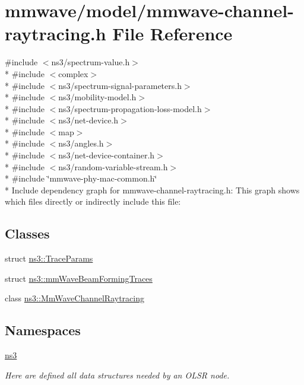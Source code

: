 \hypertarget{mmwave-channel-raytracing_8h}{}\section{mmwave/model/mmwave-\/channel-\/raytracing.h File Reference}
\label{mmwave-channel-raytracing_8h}
{\ttfamily \#include $<$ns3/spectrum-\/value.\+h$>$}\\*
{\ttfamily \#include $<$complex$>$}\\*
{\ttfamily \#include $<$ns3/spectrum-\/signal-\/parameters.\+h$>$}\\*
{\ttfamily \#include $<$ns3/mobility-\/model.\+h$>$}\\*
{\ttfamily \#include $<$ns3/spectrum-\/propagation-\/loss-\/model.\+h$>$}\\*
{\ttfamily \#include $<$ns3/net-\/device.\+h$>$}\\*
{\ttfamily \#include $<$map$>$}\\*
{\ttfamily \#include $<$ns3/angles.\+h$>$}\\*
{\ttfamily \#include $<$ns3/net-\/device-\/container.\+h$>$}\\*
{\ttfamily \#include $<$ns3/random-\/variable-\/stream.\+h$>$}\\*
{\ttfamily \#include \char`\"{}mmwave-\/phy-\/mac-\/common.\+h\char`\"{}}\\*
Include dependency graph for mmwave-\/channel-\/raytracing.h\+:
This graph shows which files directly or indirectly include this file\+:
\subsection*{Classes}
\begin{DoxyCompactItemize}
\item 
struct \hyperlink{structns3_1_1TraceParams}{ns3\+::\+Trace\+Params}
\item 
struct \hyperlink{structns3_1_1mmWaveBeamFormingTraces}{ns3\+::mm\+Wave\+Beam\+Forming\+Traces}
\item 
class \hyperlink{classns3_1_1MmWaveChannelRaytracing}{ns3\+::\+Mm\+Wave\+Channel\+Raytracing}
\end{DoxyCompactItemize}
\subsection*{Namespaces}
\begin{DoxyCompactItemize}
\item 
 \hyperlink{namespacens3}{ns3}
\begin{DoxyCompactList}\small\item\em Here are defined all data structures needed by an O\+L\+SR node. \end{DoxyCompactList}\end{DoxyCompactItemize}

